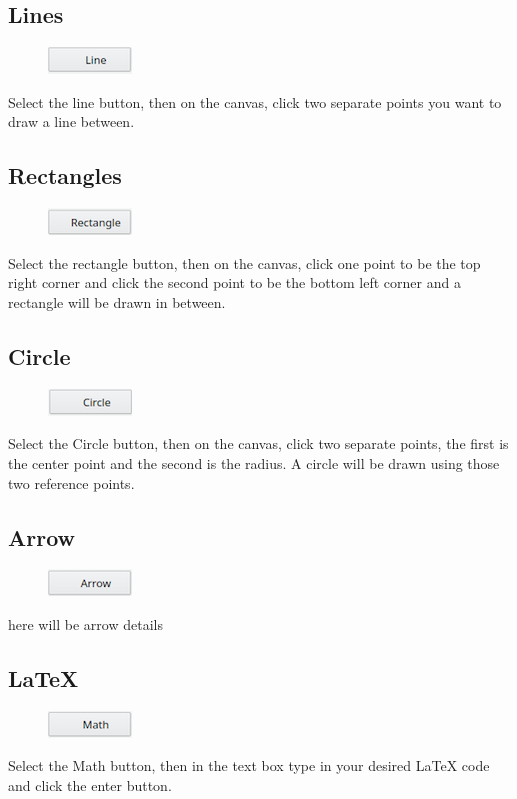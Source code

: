\subsection{Lines}
\begin{figure}[h!]
\includegraphics{line}
\end{figure}
Select the line button, then on the canvas, click two separate points you want to draw a line between.

\subsection{Rectangles}
\begin{figure}[h!]
\includegraphics{rect}
\end{figure}
Select the rectangle button, then on the canvas, click one point to be the top right corner and click the second point to be the bottom left corner and a rectangle will be drawn in between.

\subsection{Circle}
\begin{figure}[h!]
\includegraphics{circle}
\end{figure}
Select the Circle button, then on the canvas, click two separate points, the first is the center point and the second is the radius. A circle will be drawn using those two reference points.

\subsection{Arrow}
\begin{figure}[h!]
\includegraphics{arrow}
\end{figure}
here will be arrow details

\subsection{LaTeX}
\begin{figure}[h!]
\includegraphics{math}
\end{figure}
Select the Math button, then in the text box type in your desired LaTeX code and click the enter button.

